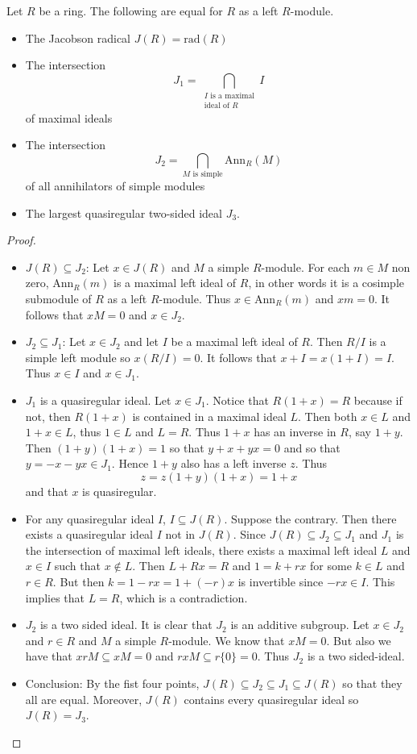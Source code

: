 \documentclass[a4paper]{article}
\begin{document}
\begin{thm}{}{} Let $R$ be a ring. The following are equal for $R$ as a left $R$-module. 
\begin{itemize}
\item The Jacobson radical $J(R)=\text{rad}(R)$
\item The intersection $$J_1=\bigcap_{\substack{I\text{ is a maximal}\\\text{ideal of }R}}I$$ of maximal ideals
\item The intersection $$J_2=\bigcap_{M\text{ is simple}}\text{Ann}_R(M)$$ of all annihilators of simple modules
\item The largest quasiregular two-sided ideal $J_3$. 
\end{itemize} 
\begin{proof}~\\
\begin{itemize}
\item $J(R)\subseteq J_2$: Let $x\in J(R)$ and $M$ a simple $R$-module. For each $m\in M$ non zero, $\text{Ann}_R(m)$ is a maximal left ideal of $R$, in other words it is a cosimple submodule of $R$ as a left $R$-module. Thus $x\in\text{Ann}_R(m)$ and $xm=0$. It follows that $xM=0$ and $x\in J_2$. 

\item $J_2\subseteq J_1$: Let $x\in J_2$ and let $I$ be a maximal left ideal of $R$. Then $R/I$ is a simple left module so $x(R/I)=0$. It follows that $x+I=x(1+I)=I$. Thus $x\in I$ and $x\in J_1$. 

\item $J_1$ is a quasiregular ideal. Let $x\in J_1$. Notice that $R(1+x)=R$ because if not, then $R(1+x)$ is contained in a maximal ideal $L$. Then both $x\in L$ and $1+x\in L$, thus $1\in L$ and $L=R$. Thus $1+x$ has an inverse in $R$, say $1+y$. Then $(1+y)(1+x)=1$ so that $y+x+yx=0$ and so that $y=-x-yx\in J_1$. Hence $1+y$ also has a left inverse $z$. Thus $$z=z(1+y)(1+x)=1+x$$ and that $x$ is quasiregular. 

\item For any quasiregular ideal $I$, $I\subseteq J(R)$. Suppose the contrary. Then there exists a quasiregular ideal $I$ not in $J(R)$. Since $J(R)\subseteq J_2\subseteq J_1$ and $J_1$ is the intersection of maximal left ideals, there exists a maximal left ideal $L$ and $x\in I$ such that $x\notin L$. Then $L+Rx=R$ and $1=k+rx$ for some $k\in L$ and $r\in R$. But then $k=1-rx=1+(-r)x$ is invertible since $-rx\in I$. This implies that $L=R$, which is a contradiction. 

\item $J_2$ is a two sided ideal. It is clear that $J_2$ is an additive subgroup. Let $x\in J_2$ and $r\in R$ and $M$ a simple $R$-module. We know that $xM=0$. But also we have that $xrM\subseteq xM=0$ and $rxM\subseteq r\{0\}=0$. Thus $J_2$ is a two sided-ideal. 

\item Conclusion: By the fist four points, $J(R)\subseteq J_2\subseteq J_1\subseteq J(R)$ so that they all are equal. Moreover, $J(R)$ contains every quasiregular ideal so $J(R)=J_3$. 
\end{itemize}
\end{proof}
\end{thm}
\end{document}
